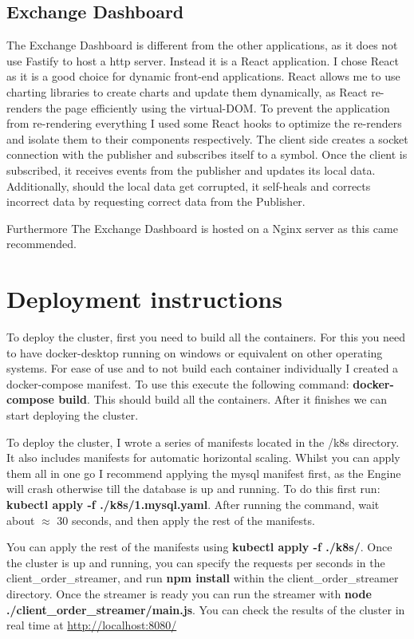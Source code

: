 \documentclass{article}
\begin{document}
\subsection{Exchange Dashboard}
\label{sec:dashboard}
The Exchange Dashboard is different from the other applications, as it does not use Fastify to host a http server.
Instead it is a React application.
I chose React as it is a good choice for dynamic front-end applications.
React allows me to use charting libraries to create charts and update them dynamically, as React re-renders the page efficiently using the virtual-DOM.
To prevent the application from re-rendering everything I used some React hooks to optimize the re-renders and isolate them to their components respectively.
The client side creates a socket connection with the publisher and subscribes itself to a symbol.
Once the client is subscribed, it receives events from the publisher and updates its local data.
Additionally, should the local data get corrupted, it self-heals and corrects incorrect data by requesting correct data from the Publisher.
\par
Furthermore The Exchange Dashboard is hosted on a Nginx server as this came recommended.
\section{Deployment instructions}
To deploy the cluster, first you need to build all the containers. For this you need to have docker-desktop running on windows or equivalent on other operating systems.
For ease of use and to not build each container individually I created a docker-compose manifest.
To use this execute the following command: \textbf{docker-compose build}. This should build all the containers. After it finishes we can start deploying the cluster.
\par
To deploy the cluster, I wrote a series of manifests located in the /k8s directory. It also includes manifests for automatic horizontal scaling.
Whilst you can apply them all in one go I recommend applying the mysql manifest first, as the Engine will crash otherwise till the database is up and running.
To do this first run: \textbf{kubectl apply -f ./k8s/1.mysql.yaml}.
After running the command, wait about $\approx$ 30 seconds, and then apply the rest of the manifests.
\par
You can apply the rest of the manifests using \textbf{kubectl apply -f ./k8s/}.
Once the cluster is up and running, you can specify the requests per seconds in the client\_order\_streamer, and run \textbf{npm install} within the client\_order\_streamer directory.
Once the streamer is ready you can run the streamer with \textbf{node ./client\_order\_streamer/main.js}.
You can check the results of the cluster in real time at \href{http://localhost:8080/}{http://localhost:8080/}
\end{document}
